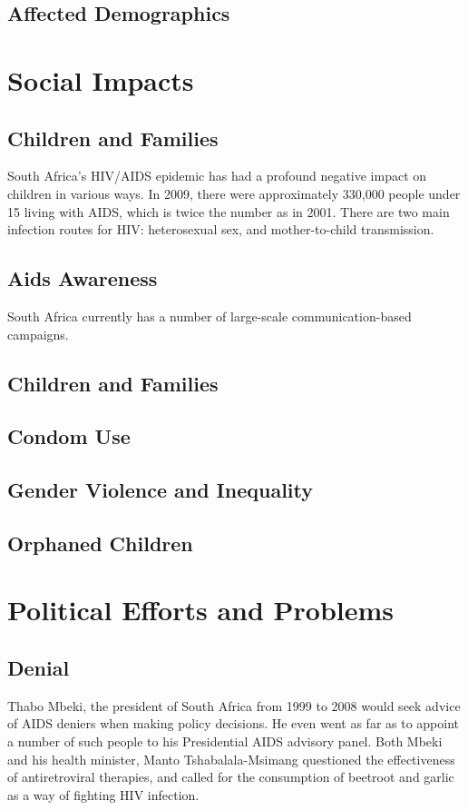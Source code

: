 \documentclass[letterpaper,12pt]{article}
\begin{document}
\subsection{Affected Demographics}

\section{Social Impacts}

\subsection{Children and Families}
South Africa's HIV/AIDS epidemic has had a profound negative impact on children in various ways.  
In 2009, there were approximately 330,000 people under 15 living with AIDS, which is twice the number as in 2001.
There are two main infection routes for HIV: heterosexual sex, and mother-to-child transmission. 

\subsection{Aids Awareness}
South Africa currently has a number of large-scale communication-based campaigns.
\subsection{Children and Families}
\subsection{Condom Use}
\subsection{Gender Violence and Inequality}
\subsection{Orphaned Children}


\section{Political Efforts and Problems}
\subsection{Denial}
Thabo Mbeki, the president of South Africa from 1999 to 2008 would seek advice of AIDS deniers when making policy decisions.  
He even went as far as to appoint a number of such people to his Presidential AIDS advisory panel.  
Both Mbeki and his health minister, Manto Tshabalala-Msimang questioned the effectiveness of antiretroviral therapies, and called for the consumption of beetroot and garlic as a way of fighting HIV infection.
\end{document}
